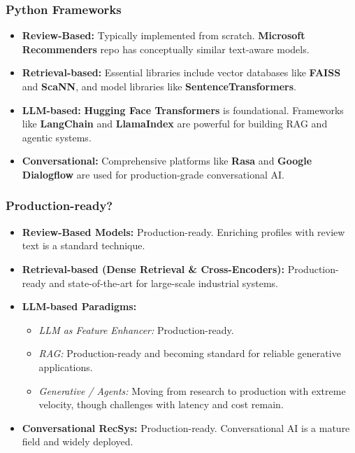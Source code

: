 \documentclass{article}
\begin{document}
    \subsubsection*{Python Frameworks}
    \begin{itemize}
        \item \textbf{Review-Based:} Typically implemented from scratch. \textbf{Microsoft Recommenders} repo has conceptually similar text-aware models.
        \item \textbf{Retrieval-based:} Essential libraries include vector databases like \textbf{FAISS} and \textbf{ScaNN}, and model libraries like \textbf{SentenceTransformers}.
        \item \textbf{LLM-based:} \textbf{Hugging Face Transformers} is foundational. Frameworks like \textbf{LangChain} and \textbf{LlamaIndex} are powerful for building RAG and agentic systems.
        \item \textbf{Conversational:} Comprehensive platforms like \textbf{Rasa} and \textbf{Google Dialogflow} are used for production-grade conversational AI.
    \end{itemize}
    
    \subsubsection*{Production-ready?}
    \begin{itemize}
        \item \textbf{Review-Based Models:} Production-ready. Enriching profiles with review text is a standard technique.
        \item \textbf{Retrieval-based (Dense Retrieval \& Cross-Encoders):} Production-ready and state-of-the-art for large-scale industrial systems.
        \item \textbf{LLM-based Paradigms:}
            \begin{itemize}
                \item \textit{LLM as Feature Enhancer:} Production-ready.
                \item \textit{RAG:} Production-ready and becoming standard for reliable generative applications.
                \item \textit{Generative / Agents:} Moving from research to production with extreme velocity, though challenges with latency and cost remain.
            \end{itemize}
        \item \textbf{Conversational RecSys:} Production-ready. Conversational AI is a mature field and widely deployed.
    \end{itemize}
    
\end{document}
